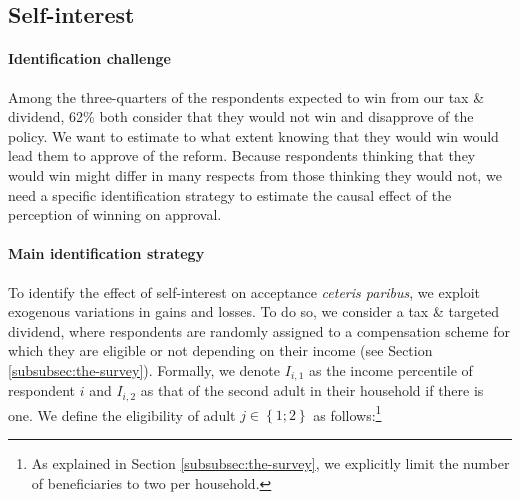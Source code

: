 \documentclass[12pt]{article} %
\begin{document}
\subsection{Self-interest \label{sec:motive_si}}

\paragraph{Identification challenge}

Among the three-quarters of the respondents expected to win from our tax \& dividend, 62\% both consider that they would not win and disapprove of the policy. We want to estimate to what extent knowing that they would win would lead them to approve of the reform. Because respondents thinking that they would win might differ in many respects from those thinking they would not, we need a specific identification strategy to estimate the causal effect of the perception of winning on approval.

\paragraph{Main identification strategy}

To identify the effect of self-interest on acceptance \textit{ceteris paribus}, we exploit exogenous variations in gains and losses. To do so, we consider a tax \& targeted dividend, where respondents are randomly assigned to a compensation scheme for which they are eligible or not depending on their income (see Section \ref{subsubsec:the-survey}). Formally, we denote $I_{i,1}$ as the income percentile of respondent $i$ and $I_{i,2}$ as that of the second adult in their household if there is one. We define the eligibility of adult $j\in \left\{1;2\right\}$ as follows:\footnote{As explained in Section \ref{subsubsec:the-survey}, we explicitly limit the number of beneficiaries to two per household.}
\end{document}
